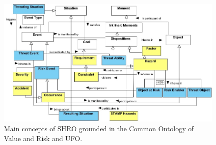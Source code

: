 \documentclass[sw]{iosart2x}
\newcommand{\COMMENT}[1]{\hl{ \textnormal{#1}}}
\newcommand{\COMMENT}[2]{\hl{ \textnormal{#1} \textbf{comment:} \textit{#2}}\xspace}
\begin{document}
\begin{figure}
\begin{center}
\includegraphics[width=\textwidth]{shro.jpg}
\end{center}
\caption{Main concepts of SHRO grounded in the Common Ontology of Value and Risk and UFO.}

\label{fig:f2}
\end{figure} 



 
\end{document}
